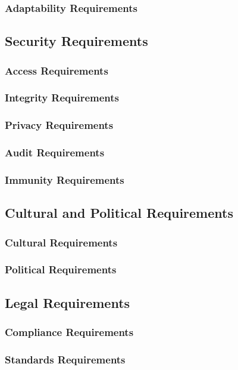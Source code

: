 \documentclass[12pt, titlepage]{article}
\begin{document}
    \subsubsection{Adaptability Requirements}

  \subsection{Security Requirements}

    \subsubsection{Access Requirements}
    \subsubsection{Integrity Requirements}
    \subsubsection{Privacy Requirements}
    \subsubsection{Audit Requirements}
    \subsubsection{Immunity Requirements}

  \subsection{Cultural and Political Requirements}

    \subsubsection{Cultural Requirements}
    \subsubsection{Political Requirements}

  \subsection{Legal Requirements}

    \subsubsection{Compliance Requirements}
    \subsubsection{Standards Requirements}
\end{document}
